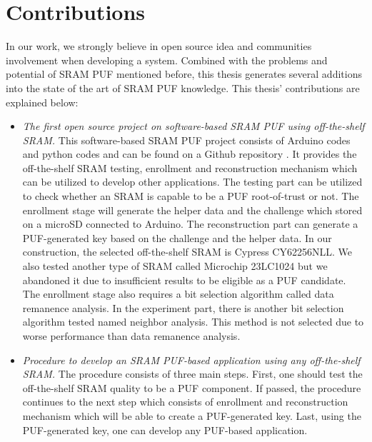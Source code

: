 \section{Contributions}
In our work, we strongly believe in open source idea and communities involvement when developing a system. Combined with the problems and potential of SRAM PUF mentioned before,
this thesis generates several additions into the state of the art of SRAM PUF knowledge. This thesis' contributions are explained below:
\begin{itemize}
    \item \textit{The first open source project on software-based SRAM PUF using off-the-shelf SRAM.}
    This software-based SRAM PUF project consists of Arduino codes and python codes and can be found on a Github repository \cite{repository}. It provides the off-the-shelf SRAM testing, enrollment and reconstruction mechanism which can be utilized to develop other applications. The testing part can be utilized to check whether an SRAM is capable to be a PUF root-of-trust or not. The enrollment stage will generate the helper data and the challenge which stored on a microSD connected to Arduino. The reconstruction part can generate a PUF-generated key based on the challenge and the helper data. In our construction, the selected off-the-shelf SRAM is Cypress CY62256NLL. We also tested another type of SRAM called Microchip 23LC1024 but we abandoned it due to insufficient results to be eligible as a PUF candidate. The enrollment stage also requires a bit selection algorithm called data remanence analysis. In the experiment part, there is another bit selection algorithm tested named neighbor analysis. This method is not selected due to worse performance than data remanence analysis.
    \item \textit{Procedure to develop an SRAM PUF-based application using any off-the-shelf SRAM.} The procedure consists of three main steps. First, one should test the off-the-shelf SRAM quality to be a PUF component. If passed, the procedure continues to the next step which consists of enrollment and reconstruction mechanism which will be able to create a PUF-generated key. Last, using the PUF-generated key, one can develop any PUF-based application.

\end{itemize}
